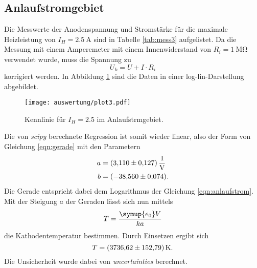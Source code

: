 \subsection{Anlaufstromgebiet}
\label{sec:anlauf}
Die Messwerte der Anodenspannung und Stromstärke für die maximale Heizleistung von $I_H=\SI{2.5}{\ampere}$ sind in Tabelle \ref{tab:mess3}
aufgelistet. Da die Messung mit einem Amperemeter mit einem Innenwiderstand von $R_i=\SI{1}{\mega\ohm}$ verwendet wurde, muss die Spannung
zu 
\begin{equation*}
    U_k=U+I\cdot R_i
\end{equation*}
korrigiert werden. In Abbildung \ref{fig:plot3} sind die Daten in einer log-lin-Darstellung abgebildet. 
\begin{figure}[H]
    \centering
    \texttt{[image: auswertung/plot3.pdf]}
    \caption{Kennlinie für $I_H=2.5$ im Anlaufstrmgebiet.}
    \label{fig:plot3}
\end{figure}
\noindent
Die von \textit{scipy} \cite{scipy} berechnete Regression ist somit wieder linear, also der Form von Gleichung \eqref{eqn:gerade} mit den Parametern
\begin{align*}
    a &= \SI{  3.11 \pm 0.127}{\per\volt}\\
    b &= \SI{-38.56 \pm 0.074}{}    .
\end{align*}
Die Gerade entspricht dabei dem Logarithmus der Gleichung \eqref{eqn:anlaufstrom}.
Mit der Steigung $a$ der Geraden lässt sich nun mittels
\begin{equation*}
    T=\frac{\symup{e_0}V}{ka}
\end{equation*}
die Kathodentemperatur bestimmen. Durch Einsetzen ergibt sich 
\begin{equation*}
    T=\SI{3736.62 \pm 152.79}{\kelvin}  .
\end{equation*}
Die Unsicherheit wurde dabei von \textit{uncertainties} \cite{uncertainties} berechnet. 

